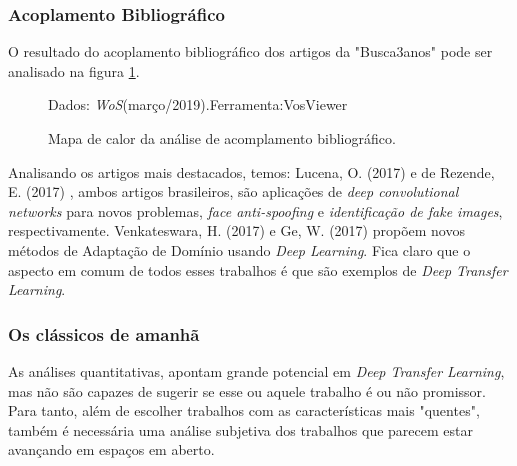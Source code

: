 \documentclass[sigconf]{acmart}
\newcommand{\source}[2]{\raggedleft{}\vspace*{-7mm}\caption*{ \textmd{\scriptsize{Dados: {#1}.\hfill Ferramenta:{#2}}}}}
\begin{document}
  \subsubsection{Acoplamento Bibliográfico}
  O resultado do acoplamento bibliográfico dos artigos da "Busca3anos" pode ser analisado na figura \ref{fig:bicoupling}.
  \begin{figure}[b]
    \source{\emph{WoS}(março/2019)}{VosViewer}
    \caption{Mapa de calor da análise de acomplamento bibliográfico.} \label{fig:bicoupling}
  \end{figure}

  Analisando os artigos mais destacados, temos:
  Lucena, O. (2017) \cite{Lucena2017} e de Rezende, E. (2017) \cite{Rezende2017}, ambos artigos brasileiros, são aplicações de \emph{deep convolutional networks} para novos problemas, \emph{face anti-spoofing} e \emph{identificação de fake images}, respectivamente.
  Venkateswara, H. (2017) \cite{Venkateswara2017} e Ge, W. (2017)\cite{Ge2017} propõem novos métodos de Adaptação de Domínio usando \emph{Deep Learning}. 
  Fica claro que o aspecto em comum de todos esses trabalhos é que são exemplos de \emph{Deep Transfer Learning}.

  \subsubsection{Os clássicos de amanhã}
  As análises quantitativas, apontam grande potencial em \emph{Deep Transfer Learning}, mas não são capazes de sugerir se esse ou aquele trabalho é ou não promissor.  Para tanto, além de escolher trabalhos com as características mais "quentes", também é necessária uma análise subjetiva dos trabalhos que parecem estar avançando em espaços em aberto. 
  
\end{document}
